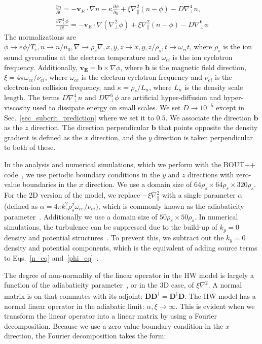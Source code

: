 \documentclass[twocolumn,showkeys,superscriptaddress]{revtex4}
\def\beqar{\begin{eqnarray}}
\def\eeqar{\end{eqnarray}}
\newcommand{\pdiff}[2]{\frac{\partial#1}{\partial#2}}
\def\grad{\nabla}
\newcommand{\gradpar}{\grad_\parallel}
\newcommand{\gradperp}{\grad_\perp}
\begin{document}
\beqar
\label{n_eq}
\pdiff{n}{t} = - {\mathbf v_E} \cdot \grad n - \kappa \pdiff{\phi}{y} + \xi \gradpar^2 (n - \phi) - D \gradperp^4 n, \\
\label{phi_eq}
\pdiff{\gradperp^2 \phi}{t} = - {\mathbf v_E} \cdot \grad (\gradperp^2 \phi) + \xi \gradpar^2 (n - \phi) - D \gradperp^6 \phi
\eeqar
The normalizations are $\phi \to e \phi/T_e, n \to n/n_0, \grad \to \rho_s \grad , x,y,z \to x,y,z/\rho_s, t \to \omega_{ci} t $, where $\rho_s$ is the ion sound gyroradius at the electron temperature and $\omega_{ci}$ is
the ion cyclotron frequency. Additionally, $\mathbf{v_E} = \mathbf{b} \times \grad \phi$, where $\mathbf{b}$ is the magnetic field direction, $\xi = 4 \pi \omega_{ce}/\nu_{ei}$, where $\omega_{ce}$ is the electron cyclotron
frequency and $\nu_{ei}$ is the electron-ion collision frequency,
and $\kappa = \rho_s/L_n$, where $L_n$ is the density scale length. The terms $D \gradperp^4 n$ and $D \gradperp^6 \phi$ are artificial hyper-diffusion and hyper-viscosity used to dissipate
energy on small scales. We set $D \to 10^{-5}$ except in Sec.~\ref{sec_subcrit_prediction} where we set it to $0.5$.
We associate the direction $\mathbf{b}$ as the $z$ direction. The direction perpendicular $\mathbf{b}$ that
points opposite the density gradient is defined as the $x$ direction, and the $y$ direction is taken perpendicular to both of these.

In the analysis and numerical simulations, which we perform with the BOUT++ code~\cite{dudson2009}, we use periodic boundary conditions in
the $y$ and $z$ directions with zero-value boundaries in the $x$ direction. We use a domain size of $64 \rho_s \times 64 \rho_s \times 320 \rho_s$.
For the 2D version of the model, we replace $-\xi \gradpar^2$ with a single parameter $\alpha$ (defined as $\alpha = 4 \pi k_z^2 \rho_s^2 \omega_{ce} /\nu_{ei})$, 
which is commonly known as the adiabaticity parameter~\cite{camargo1995,camargo1998}. Additionally we use a domain size of $50 \rho_s \times 50 \rho_s$.
In numerical simulations, the turbulence can be suppressed due to the build-up of $k_y=0$ density and potential structures~\cite{biskamp1995}. To prevent this, we subtract out the $k_y=0$
density and potential components, which is the equivalent of adding source terms to Eqs.~\ref{n_eq} and~\ref{phi_eq}~\cite{friedman2012b}.

The degree of non-normality of the linear operator in the HW model is largely a function of the adiabaticity parameter~\cite{camargo1998}, or in the 3D case, of $\xi \gradpar^2$. 
A normal matrix is on that commutes with its adjoint: $\mathbf{D} \mathbf{D}^\dagger = \mathbf{D}^\dagger \mathbf{D}$.
The HW model has a normal linear operator in the adiabatic limit: $\alpha, \xi \to \infty$. 
This is evident when we transform the linear operator into a linear matrix by using a Fourier decomposition. Because we use a zero-value boundary condition in the $x$ direction, the
Fourier decomposition takes the form:
\end{document}
